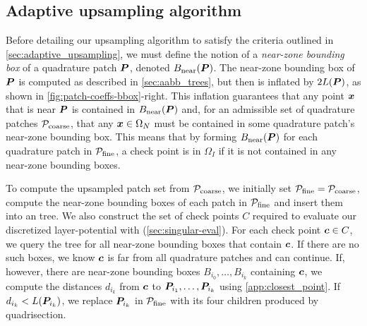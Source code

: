 \subsection{Adaptive upsampling algorithm \label{sec:adaptive_upsampling_algo}}
Before detailing our upsampling algorithm to satisfy the criteria outlined in \cref{sec:adaptive_upsampling}, we must define the notion of a \textit{near-zone bounding box} of a quadrature patch ${\bm{P}}$, denoted $B_{\mathrm{near}}({\bm{P}})$.
The near-zone bounding box of ${\bm{P}}$ is computed as described in \cref{sec:aabb_trees}, but then is inflated by $2L({\bm{P}})$, as shown in \cref{fig:patch-coeffs-bbox}-right.
This inflation guarantees that any point ${\bm{x}}$ that is near ${\bm{P}}$ is contained in $B_{\mathrm{near}}({\bm{P}})$ and, for an admissible set of quadrature patches ${\mathcal{P}_{\mathrm{coarse}}}$, that any ${\bm{x}}\in \Omega_N$ must be contained in some quadrature patch's near-zone bounding box.
This means that by forming $B_{\mathrm{near}}({\bm{P}})$ for each quadrature patch in ${\mathcal{P}_{\mathrm{fine}}}$, a check point is in $\Omega_I$ if it is not contained in any near-zone bounding boxes.

To compute the upsampled patch set from ${\mathcal{P}_{\mathrm{coarse}}}$, we initially set ${\mathcal{P}_{\mathrm{fine}}} = {\mathcal{P}_{\mathrm{coarse}}}$, compute the near-zone bounding boxes of each patch in ${\mathcal{P}_{\mathrm{fine}}}$ and insert them into an \aabb tree.
We also construct the set of check points $C$ required to evaluate our discretized layer-potential with \qbkix (\cref{sec:singular-eval}).
For each check point ${\bm{c}} \in C$, we query the \aabb tree for all near-zone bounding boxes that contain ${\bm{c}}$.
If there are no such boxes, we know ${\bm{c}}$ is far from all quadrature patches and can continue.
If, however, there are near-zone bounding boxes $B_{i_0},\hdots, B_{i_k}$ containing ${\bm{c}}$, we compute the distances $d_{i_k}$ from ${\bm{c}}$ to ${\bm{P}}_{i_1},\hdots,{\bm{P}}_{i_k}$ using \cref{app:closest_point}.
If $d_{i_k} < L({\bm{P}}_{i_k})$, we replace ${\bm{P}}_{i_k}$ in ${\mathcal{P}_{\mathrm{fine}}}$ with its four children produced by quadrisection.



